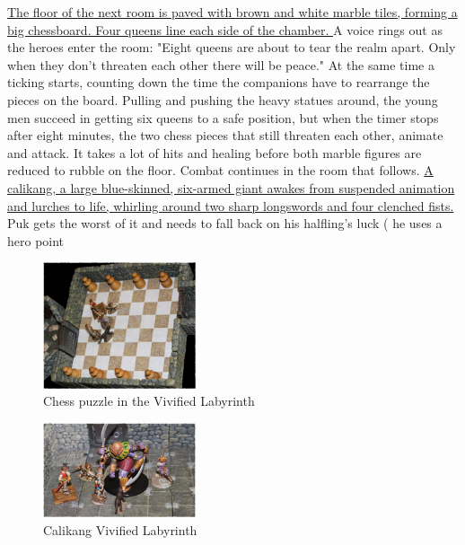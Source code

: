 \hyperref[fig:Chess-puzzle-in-the-Vivified-Labyrinth-565298239]{ The floor of the next room is paved with brown and white marble tiles, forming a big chessboard. Four queens line each side of the chamber. } A voice rings out as the heroes enter the room: "Eight queens are about to tear the realm apart. Only when they don't threaten each other there will be peace." At the same time a ticking starts, counting down the time the companions have to rearrange the pieces on the board. Pulling and pushing the heavy statues around, the young men succeed in getting six queens to a safe position, but when the timer stops after eight minutes, the two chess pieces that still threaten each other, animate and attack. It takes a lot of hits and healing before both marble figures are reduced to rubble on the floor. Combat continues in the room that follows. \hyperref[fig:Calikang-Vivified-Labyrinth-565300031]{ A calikang, a large blue-skinned, six-armed giant awakes from suspended animation and lurches to life, whirling around two sharp longswords and four clenched fists. } Puk gets the worst of it and needs to fall back on his halfling's luck ( he uses a hero point \\

\begin{figure}[h]
	\centering
	\includegraphics[width=0.4\textwidth]{images/Chess-puzzle-in-the-Vivified-Labyrinth-565298239_mod.jpg}
	\caption{Chess puzzle in the Vivified Labyrinth}
	\label{fig:Chess-puzzle-in-the-Vivified-Labyrinth-565298239}
\end{figure}

\begin{figure}[h]
	\centering
	\includegraphics[width=0.4\textwidth]{images/Calikang-Vivified-Labyrinth-565300031_mod.jpg}
	\caption{Calikang Vivified Labyrinth}
	\label{fig:Calikang-Vivified-Labyrinth-565300031}
\end{figure}

